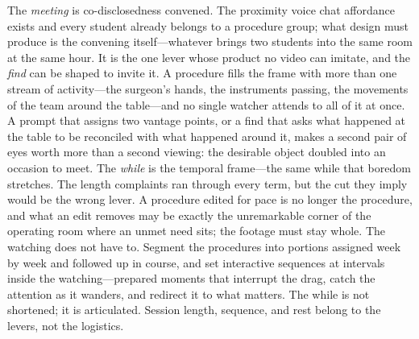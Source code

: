 The \textit{meeting} is co-disclosedness convened. The proximity voice
chat affordance exists and every student already belongs to a procedure
group; what design must produce is the convening itself---whatever
brings two students into the same room at the same hour. It is the one
lever whose product no video can imitate, and the \textit{find} can be
shaped to invite it. A procedure fills the frame with more than one
stream of activity---the surgeon's hands, the instruments passing, the
movements of the team around the table---and no single watcher attends
to all of it at once. A prompt that assigns two vantage points, or a
find that asks what happened at the table to be reconciled with what
happened around it, makes a second pair of eyes worth more than a
second viewing: the desirable object doubled into an occasion to meet.
The \textit{while} is the temporal frame---the same while that boredom
stretches. The length complaints ran through every term, but the cut
they imply would be the wrong lever. A procedure edited for pace is no
longer the procedure, and what an edit removes may be exactly the
unremarkable corner of the operating room where an unmet need sits;
the footage must stay whole. The watching does not have to. Segment
the procedures into portions assigned week by week and followed up in
course, and set interactive sequences at intervals inside the
watching---prepared moments that interrupt the drag, catch the
attention as it wanders, and redirect it to what matters. The while is
not shortened; it is articulated. Session length, sequence, and rest
belong to the levers, not the logistics.

